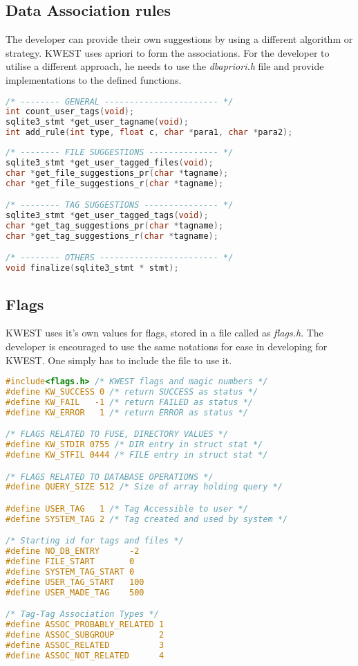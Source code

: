 \subsection{Data Association rules}
The developer can provide their own suggestions by using a different algorithm or strategy. KWEST uses apriori to form the associations. For the developer to utilise a different approach, he needs to use the \textit{dbapriori.h} file and provide implementations to the defined functions.

\begin{lstlisting}[language=C,frame=single]
/* -------- GENERAL ----------------------- */
int count_user_tags(void);
sqlite3_stmt *get_user_tagname(void);
int add_rule(int type, float c, char *para1, char *para2);
\end{lstlisting}
\begin{lstlisting}[language=C,frame=single]
/* -------- FILE SUGGESTIONS -------------- */
sqlite3_stmt *get_user_tagged_files(void);
char *get_file_suggestions_pr(char *tagname);
char *get_file_suggestions_r(char *tagname);

/* -------- TAG SUGGESTIONS --------------- */
sqlite3_stmt *get_user_tagged_tags(void);
char *get_tag_suggestions_pr(char *tagname);
char *get_tag_suggestions_r(char *tagname);

/* -------- OTHERS ------------------------ */
void finalize(sqlite3_stmt * stmt);
\end{lstlisting}

\subsection{Flags}
KWEST uses it's own values for flags, stored in a file called as \textit{flags.h}. The developer is encouraged to use the same notations for ease in developing for KWEST. One simply has to include the file to use it.
\begin{lstlisting}[language=C,frame=single]
#include<flags.h> /* KWEST flags and magic numbers */
#define KW_SUCCESS 0 /* return SUCCESS as status */
#define KW_FAIL   -1 /* return FAILED as status */
#define KW_ERROR   1 /* return ERROR as status */

/* FLAGS RELATED TO FUSE, DIRECTORY VALUES */
#define KW_STDIR 0755 /* DIR entry in struct stat */
#define KW_STFIL 0444 /* FILE entry in struct stat */

/* FLAGS RELATED TO DATABASE OPERATIONS */
#define QUERY_SIZE 512 /* Size of array holding query */

#define USER_TAG   1 /* Tag Accessible to user */
#define SYSTEM_TAG 2 /* Tag created and used by system */

/* Starting id for tags and files */
#define NO_DB_ENTRY      -2
#define FILE_START       0
#define SYSTEM_TAG_START 0
#define USER_TAG_START   100
#define USER_MADE_TAG    500

/* Tag-Tag Association Types */
#define ASSOC_PROBABLY_RELATED 1
#define ASSOC_SUBGROUP         2
#define ASSOC_RELATED          3
#define ASSOC_NOT_RELATED      4
\end{lstlisting}

